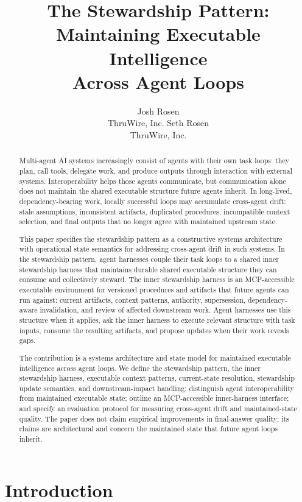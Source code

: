 \documentclass{article}
\title{The Stewardship Pattern:\\
Maintaining Executable Intelligence\\
Across Agent Loops}
\author{
  Josh Rosen \\
  ThruWire, Inc.
  \And
  Seth Rosen \\
  ThruWire, Inc.
}
\begin{document}
\maketitle

\begin{abstract}
Multi-agent AI systems increasingly consist of agents with their own task loops: they plan, call tools, delegate work, and produce outputs through interaction with external systems. Interoperability helps those agents communicate, but communication alone does not maintain the shared executable structure future agents inherit. In long-lived, dependency-bearing work, locally successful loops may accumulate cross-agent drift: stale assumptions, inconsistent artifacts, duplicated procedures, incompatible context selection, and final outputs that no longer agree with maintained upstream state.

This paper specifies the stewardship pattern as a constructive systems architecture with operational state semantics for addressing cross-agent drift in such systems. In the stewardship pattern, agent harnesses couple their task loops to a shared inner stewardship harness that maintains durable shared executable structure they can consume and collectively steward. The inner stewardship harness is an MCP-accessible executable environment for versioned procedures and artifacts that future agents can run against: current artifacts, context patterns, authority, supersession, dependency-aware invalidation, and review of affected downstream work. Agent harnesses use this structure when it applies, ask the inner harness to execute relevant structure with task inputs, consume the resulting artifacts, and propose updates when their work reveals gaps.

The contribution is a systems architecture and state model for maintained executable intelligence across agent loops. We define the stewardship pattern, the inner stewardship harness, executable context patterns, current-state resolution, stewardship update semantics, and downstream-impact handling; distinguish agent interoperability from maintained executable state; outline an MCP-accessible inner-harness interface; and specify an evaluation protocol for measuring cross-agent drift and maintained-state quality. The paper does not claim empirical improvements in final-answer quality; its claims are architectural and concern the maintained state that future agent loops inherit.
\end{abstract}

\section{Introduction}
\end{document}
